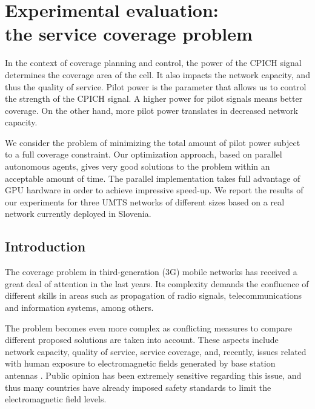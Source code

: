 
\chapter{Experimental evaluation:\protect \\
the service coverage problem \label{chap:Experimental-evaluation-the-service-coverage-problem}}


In the context of coverage planning and control, the power of the
CPICH signal determines the coverage area of the cell. It also impacts
the network capacity, and thus the quality of service. Pilot power
is the parameter that allows us to control the strength of the CPICH
signal. A higher power for pilot signals means better coverage. On
the other hand, more pilot power translates in decreased network capacity.

We consider the problem of minimizing the total amount of pilot power
subject to a full coverage constraint. Our optimization approach,
based on parallel autonomous agents, gives very good solutions to
the problem within an acceptable amount of time. The parallel implementation
takes full advantage of GPU hardware in order to achieve impressive
speed-up. We report the results of our experiments for three UMTS
networks of different sizes based on a real network currently deployed
in Slovenia.


\section{Introduction}

The coverage problem in third-generation (3G) mobile networks has
received a great deal of attention in the last years. Its complexity
demands the confluence of different skills in areas such as propagation
of radio signals, telecommunications and information systems, among
others.

The problem becomes even more complex as conflicting measures to compare
different proposed solutions are taken into account. These aspects
include network capacity, quality of service, service coverage, and,
recently, issues related with human exposure to electromagnetic fields
generated by base station antennas \cite{Esposito_Genetic.optimization.for.optimum.3G.network.planning:2010}.
Public opinion has been extremely sensitive regarding this issue,
and thus many countries have already imposed safety standards to limit
the electromagnetic field levels.


